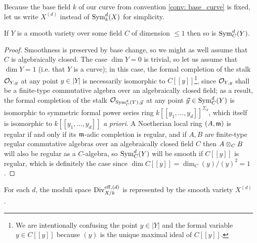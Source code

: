         \begin{convention}
            Because the base field $k$ of our curve from convention \ref{conv: base_curve} is fixed, let us write $X^{(d)}$ instead of $\mathrm{Sym}^d_k(X)$ for simplicity.
        \end{convention}
        \begin{lemma} \label{lemma: smoothness_of_symmetric_powers}
            If $Y$ is a smooth variety over some field $C$ of dimension $\leq 1$ then so is $\mathrm{Sym}_C^d(Y)$.
        \end{lemma}
            \begin{proof}
                Smoothness is preserved by base change, so we might as well assume that $C$ is algebraically closed. The case $\dim Y = 0$ is trivial, so let us assume that $\dim Y = 1$ (i.e. that $Y$ is a curve); in this case, the formal completion of the stalk $\mathcal{O}_{Y, y}$ at any point $y \in |Y|$ is necessarily isomorphic to $C[\![y]\!]$\footnote{We are intentionally confusing the point $y \in |Y|$ and the formal variable $y \in C[\![y]\!]$ because $(y)$ is the unique maximal ideal of $C[\![y]\!]$.}, since $\mathcal{O}_{Y, y}$ shall be a finite-type commutative algebra over an algebraically closed field; as a result, the formal completion of the stalk $\mathcal{O}_{\mathrm{Sym}^d_C(Y), \vec{y}}$ at any point $\vec{y} \in \mathrm{Sym}^d_C(Y)$ is isomorphic to symmetric formal power series ring $k[\![y_1, ..., y_d]\!]^{\Sigma_d}$, which itself is isomorphic to $k[\![y_1, ..., y_d]\!]$ \textit{a priori}. A Noetherian local ring $(A, \mathfrak{m})$ is regular if and only if its $\mathfrak{m}$-adic completion is regular, and if $A, B$ are finite-type regular commutative algebras over an algebraically closed field $C$ then $A \tensor_C B$ will also be regular as a $C$-algebra, so $\mathrm{Sym}_C^d(Y)$ will be smooth if $C[\![y]\!]$ is regular, which is definitely the case since $\dim C[\![y]\!] = \dim_C (y)/(y)^2 = 1$.
            \end{proof}
        \begin{proposition} \label{prop: symmetric_powers_of_curves_parametrise_divisors}
            For each $d$, the moduli space $\mathrm{Div}_{X/k}^{\mathrm{eff}, (d)}$ is represented by the smooth variety $X^{(d)}$.
        \end{proposition}
